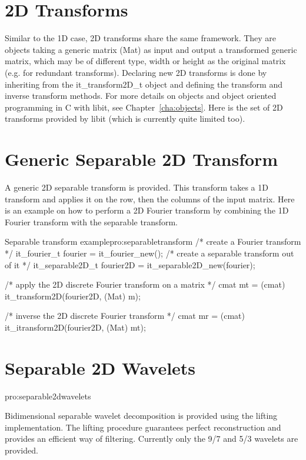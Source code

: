 \section{2D Transforms}
\label{sec:2dtransforms}

    Similar to the 1D case, 2D transforms share the same
  framework. They are objects taking a generic matrix (Mat) as input
  and output a transformed generic matrix, which may be of different
  type, width or height as the original matrix (e.g. for redundant
  transforms). Declaring new 2D transforms is done by inheriting from
  the it\_transform2D\_t object and defining the transform and inverse
  transform methods. For more details on objects and object oriented
  programming in C with libit, see Chapter~\ref{cha:objects}. Here is
  the set of 2D transforms provided by libit (which is currently quite
  limited too). 

\section{Generic Separable 2D Transform}
\label{sec:genericseparable2dtransform}

    A generic 2D separable transform is provided. This transform takes
  a 1D transform and applies it on the row, then the columns of the
  input matrix. Here is an example on how to perform a 2D Fourier
  transform by combining the 1D Fourier transform with the separable
  transform.  

\begin{program}{Separable transform example}{pro:separabletransform}
/* create a Fourier transform */
it_fourier_t fourier = it_fourier_new();
/* create a separable transform out of it */
it_separable2D_t fourier2D = it_separable2D_new(fourier);

/* apply the 2D discrete Fourier transform on a matrix */
cmat mt = (cmat) it_transform2D(fourier2D, (Mat) m);

/* inverse the 2D discrete Fourier transform */
cmat mr = (cmat) it_itransform2D(fourier2D, (Mat) mt);
\end{program}

\section{Separable 2D Wavelets}{pro:separable2dwavelets}

     Bidimensional separable wavelet decomposition is provided using
the lifting implementation. The lifting procedure guarantees perfect
reconstruction and provides an efficient way of filtering. Currently
only the 9/7 and 5/3 wavelets are provided.  

